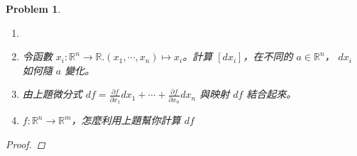 \documentclass[10pt,a4paper]{article}
\newcounter{theProblemCounter}
\newtheorem{problem}[theProblemCounter]{Problem}
\begin{document}
\setcounter{theProblemCounter}{7}
\begin{problem}
\begin{enumerate}
\item[]
\item[(a)] 令函數 $x_i:\mathbb{R}^n\to \mathbb{R}. (x_1,\cdots, x_n)\mapsto x_i$。計算 $[dx_i]$，在不同的 $a\in \mathbb{R}^n$， $dx_i$ 如何隨 $a$ 變化。
\item[(b)] 由上題微分式 $df=\frac{\partial f}{\partial x_1} dx_1 + \cdots + \frac{\partial f}{\partial x_n} dx_n$ 與映射 $df$ 結合起來。
\item[(c)] $f:\mathbb{R}^n\to \mathbb{R}^m$，怎麼利用上題幫你計算 $df$
\end{enumerate}
\begin{proof}
\end{proof}
\end{problem}
\end{document}
